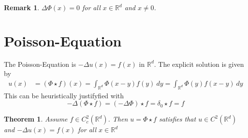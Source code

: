 \documentclass{report}
\theoremstyle{tommy}
\newtheorem{thm}[defn]{Theorem}
\newtheorem{rem}[defn]{Remark}
\begin{document}
\begin{rem}
  \(\Delta \Phi(x) = 0\) for all \(x \in \mathbb{R}^d\) and \(x \ne 0\). 
\end{rem}


\section{Poisson-Equation}
The Poisson-Equation is \(-\Delta u(x) = f(x)\) in \(\mathbb{R}^d\). The explicit solution is given by
\begin{align*}
  u(x) &= (\Phi \star f)(x)
  = \int_{\mathbb{R}^d} \Phi(x-y)f(y) \ dy 
  = \int_{\mathbb{R}^d} \Phi(y)f(x-y) \ dy
\end{align*}
This can be heuristically justifyfied with \[-\Delta (\Phi \star f) = (-\Delta \Phi) \star f = \delta_0 \star f = f\]


\begin{thm}
  Assume \(f \in C_c^2(\mathbb{R}^d)\). Then \(u = \Phi \star f\) satisfies that \(u \in C^2(\mathbb{R}^d)\) and \(- \Delta u(x) = f(x)\) for all \(x \in \mathbb{R}^d\)
\end{thm}
\end{document}
